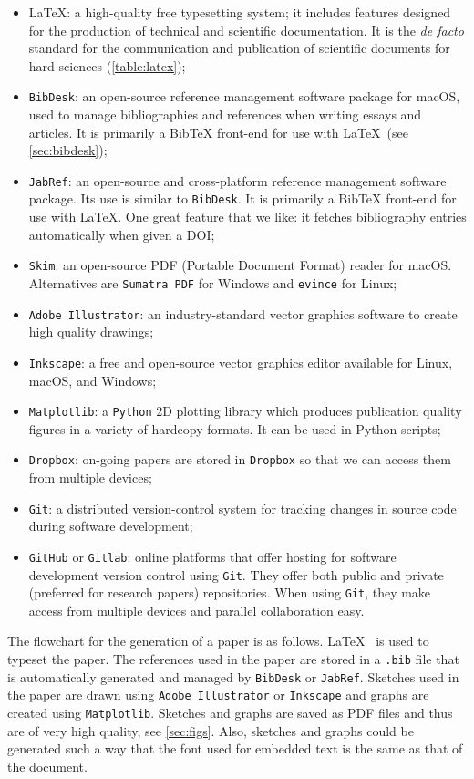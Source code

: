 \documentclass[authoryear,12pta4paper,fleqn]{article}
\numberwithin{equation}{section}
\theoremstyle{remark}
\begin{document}
\begin{itemize}
\item \LaTeX:  a high-quality free typesetting system; it includes features designed for the production of technical and scientific documentation. It is the \textit{de facto} standard for the communication and publication of scientific documents for hard sciences (\cref{table:latex}); 
\item \texttt{BibDesk}: an open-source reference management software package for macOS, used to manage bibliographies and references when writing essays and articles. It is primarily a BibTeX front-end for use with \LaTeX\ (see \cref{sec:bibdesk});
\item \texttt{JabRef}:  an open-source and cross-platform reference management software package. Its use is similar to \texttt{BibDesk}. It is primarily a BibTeX front-end for use with \LaTeX. One great feature that we like: it fetches bibliography entries automatically when given a DOI;
\item \texttt{Skim}: an open-source PDF (Portable Document Format) reader for macOS. Alternatives are \texttt{Sumatra PDF} for Windows and \texttt{evince} for Linux;
\item \texttt{Adobe Illustrator}: an industry-standard vector graphics software to create high quality drawings;
\item \texttt{Inkscape}: a free and open-source vector graphics editor available for Linux, macOS, and Windows;
\item \texttt{Matplotlib}: a \texttt{Python} 2D plotting library which produces publication quality figures in a variety of hardcopy formats. It can be used in Python scripts;
\item \texttt{Dropbox}: on-going papers are stored in \texttt{Dropbox} so that we can access them from multiple devices;
\item \texttt{Git}:  a distributed version-control system for tracking changes in source code during software development;
\item \texttt{GitHub} or \texttt{Gitlab}: online platforms that offer hosting for software development version control using \texttt{Git}. They offer both public and private (preferred for research papers) repositories. When using \texttt{Git}, they make access from multiple devices and parallel collaboration easy.
\end{itemize}

The flowchart for the generation of a paper is as follows. \LaTeX~ is used to typeset the paper. The references used in the paper are stored in a \texttt{.bib} file that is automatically generated and managed by \texttt{BibDesk} or \texttt{JabRef}. Sketches used in the paper are drawn using \texttt{Adobe Illustrator} or \texttt{Inkscape} and graphs are created using \texttt{Matplotlib}. Sketches and graphs are saved as PDF files and thus are of very high quality, see \cref{sec:figs}. Also, sketches and graphs could be generated such a way that the font used for embedded text is the same as that of the  document.
\end{document}
